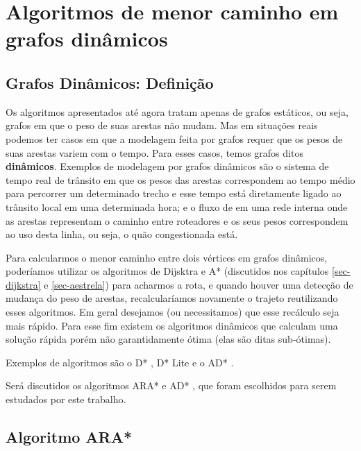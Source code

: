 \chapter{Algoritmos de menor caminho em grafos dinâmicos}
\label{sec-dinamicos}

\section{Grafos Dinâmicos: Definição}
\label{sec-dinamicos-grafos}
Os algoritmos apresentados até agora tratam apenas de grafos estáticos, ou seja, grafos em que o peso de suas arestas não mudam. Mas em situações reais podemos ter casos em que a modelagem feita por grafos requer que os pesos de suas arestas variem com o tempo. Para esses casos, temos grafos ditos \textbf{dinâmicos}. Exemplos de modelagem por grafos dinâmicos são o sistema de tempo real de trânsito em que os pesos das arestas correspondem ao tempo médio para percorrer um determinado trecho e esse tempo está diretamente ligado ao trânsito local em uma determinada hora; e o fluxo de em uma rede interna onde as arestas representam o caminho entre roteadores e os seus pesos correspondem ao uso desta linha, ou seja, o quão congestionada está.

Para calcularmos o menor caminho entre dois vértices em grafos dinâmicos, poderíamos utilizar os algoritmos de Dijsktra e A* (discutidos nos capítulos \ref{sec-dijkstra} e \ref{sec-aestrela})  para acharmos a rota, e quando houver uma detecção de mudança do peso de arestas, recalcularíamos novamente o trajeto reutilizando esses algoritmos. Em geral desejamos (ou necessitamos) que esse recálculo seja mais rápido. Para esse fim existem os algoritmos dinâmicos que calculam uma solução rápida porém não garantidamente ótima (elas são ditas sub-ótimas).

Exemplos de algoritmos são o D* \cite{stentz1994optimal}, D* Lite \cite{koenig2002d} e o AD* \cite{likhachev2008anytime}.

Será discutidos os algoritmos ARA* e AD* \cite{likhachev2008anytime}, que foram escolhidos para serem estudados por este trabalho.
\section{Algoritmo ARA*}
\label{sec-dinamicos-ara}

